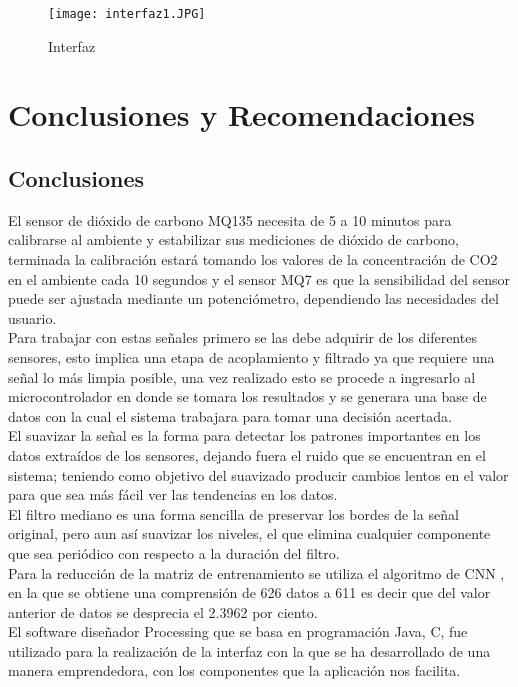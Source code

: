 \documentclass[10pt,a4paper]{article}
\begin{document}
\begin{figure}[H]
\centering
\texttt{[image: interfaz1.JPG]}
\caption{Interfaz} 
\end{figure}

\section{Conclusiones y Recomendaciones}
\subsection{Conclusiones}

El sensor de dióxido de carbono MQ135 necesita de 5 a 10 minutos para calibrarse al ambiente y estabilizar sus mediciones de dióxido de carbono, terminada la calibración estará tomando los valores de la concentración de CO2 en el ambiente cada 10 segundos y el sensor MQ7 es que la sensibilidad del sensor puede ser ajustada mediante un potenciómetro, dependiendo las necesidades del usuario.\\

Para trabajar con estas señales primero se las debe adquirir de los diferentes sensores, esto implica una etapa de acoplamiento y ﬁltrado ya que requiere una señal lo más limpia posible, una vez realizado esto se procede a ingresarlo al microcontrolador en donde se tomara los resultados y se generara una base de datos con la cual el sistema trabajara para tomar una decisión acertada. \\

El suavizar la señal es la forma para detectar los patrones importantes en los datos extraídos de los sensores, dejando fuera el ruido que se encuentran en el sistema; teniendo como objetivo del suavizado producir cambios lentos en el valor para que sea más fácil ver las tendencias en los datos.\\

El filtro mediano es una forma sencilla de preservar los bordes de la señal original, pero aun así suavizar los niveles, el que elimina cualquier componente que sea periódico con respecto a la duración del filtro.\\

Para la reducción de la matriz de entrenamiento se utiliza el algoritmo de CNN , en la que se obtiene una comprensión de 626 datos a 611 es decir que del valor anterior de datos se desprecia el 2.3962 por ciento.\\

El software diseñador Processing que se basa en programación Java, C, fue utilizado para la realización de la interfaz con la que se ha desarrollado de una manera emprendedora, con los componentes que la aplicación nos facilita.\\
\end{document}
